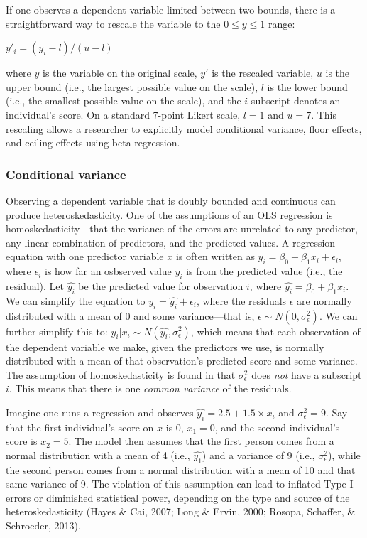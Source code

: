 \documentclass[english,man]{apa6}
\theoremstyle{definition}
\theoremstyle{definition}
\theoremstyle{remark}
\begin{document}
If one observes a dependent variable limited between two bounds, there
is a straightforward way to rescale the variable to the
\(0 \leq y \leq 1\) range:

\begin{center}
$y'_i = (y_i - l) / (u - l)$
\end{center}

where \(y\) is the variable on the original scale, \(y'\) is the
rescaled variable, \(u\) is the upper bound (i.e., the largest possible
value on the scale), \(l\) is the lower bound (i.e., the smallest
possible value on the scale), and the \(i\) subscript denotes an
individual's score. On a standard 7-point Likert scale, \(l = 1\) and
\(u = 7\). This rescaling allows a researcher to explicitly model
conditional variance, floor effects, and ceiling effects using beta
regression.

\subsubsection{Conditional variance}\label{conditional-variance}

Observing a dependent variable that is doubly bounded and continuous can
produce heteroskedasticity. One of the assumptions of an OLS regression
is homoskedasticity---that the variance of the errors are unrelated to
any predictor, any linear combination of predictors, and the predicted
values. A regression equation with one predictor variable \(x\) is often
written as \(y_i = \beta_0 + \beta_1x_i + \epsilon_i\), where
\(\epsilon_i\) is how far an osbserved value \(y_i\) is from the
predicted value (i.e., the residual). Let \(\hat{y_i}\) be the predicted
value for observation \(i\), where \(\hat{y_i} = \beta_0 + \beta_1x_i\).
We can simplify the equation to \(y_i = \hat{y_i} + \epsilon_i\), where
the residuals \(\epsilon\) are normally distributed with a mean of 0 and
some variance---that is, \(\epsilon \sim N(0, \sigma^2_\epsilon)\). We
can further simplify this to:
\(y_i|x_i \sim N(\hat{y_i}, \sigma^2_\epsilon)\), which means that each
observation of the dependent variable we make, given the predictors we
use, is normally distributed with a mean of that observation's predicted
score and some variance. The assumption of homoskedasticity is found in
that \(\sigma^2_\epsilon\) does \emph{not} have a subscript \(i\). This
means that there is one \emph{common variance} of the residuals.

Imagine one runs a regression and observes
\(\hat{y_i} = 2.5 + 1.5 \times x_i\) and \(\sigma^2_\epsilon = 9\). Say
that the first individual's score on \(x\) is 0, \(x_1 = 0\), and the
second individual's score is \(x_2 = 5\). The model then assumes that
the first person comes from a normal distribution with a mean of 4
(i.e., \(\hat{y_1}\)) and a variance of 9 (i.e., \(\sigma^2_\epsilon\)),
while the second person comes from a normal distribution with a mean of
10 and that same variance of 9. The violation of this assumption can
lead to inflated Type I errors or diminished statistical power,
depending on the type and source of the heteroskedasticity (Hayes \&
Cai, 2007; Long \& Ervin, 2000; Rosopa, Schaffer, \& Schroeder, 2013).
\end{document}

